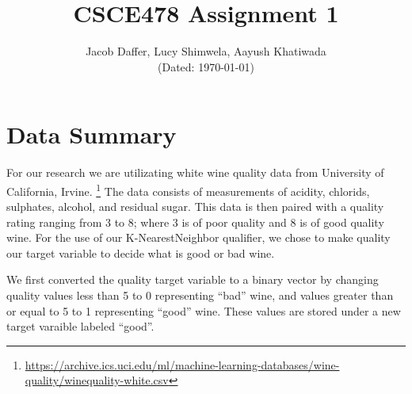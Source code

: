 \documentclass[]{IEEEtran}
\begin{document}
\title{CSCE478 Assignment 1}
\author{Jacob Daffer, Lucy Shimwela, Aayush Khatiwada\\
(Dated: \today)}

\maketitle

\section{Data Summary}

For our research we are utilizating white wine quality data from University of California, Irvine.
\footnote{\url{https://archive.ics.uci.edu/ml/machine-learning-databases/wine-quality/winequality-white.csv}}
The data consists of measurements of acidity, chlorids, sulphates, alcohol, and residual sugar.
This data is then paired with a quality rating ranging from 3 to 8; where 3 is of poor quality and 8 is of good quality wine.
For the use of our K-NearestNeighbor qualifier, we chose to make quality our target variable to decide what is good or bad wine.

We first converted the quality target variable to a binary vector by changing quality values less than 5 to 0 representing ``bad'' wine, and values greater than or equal to 5 to 1 representing ``good'' wine.
These values are stored under a new target varaible labeled ``good''.
\end{document}
